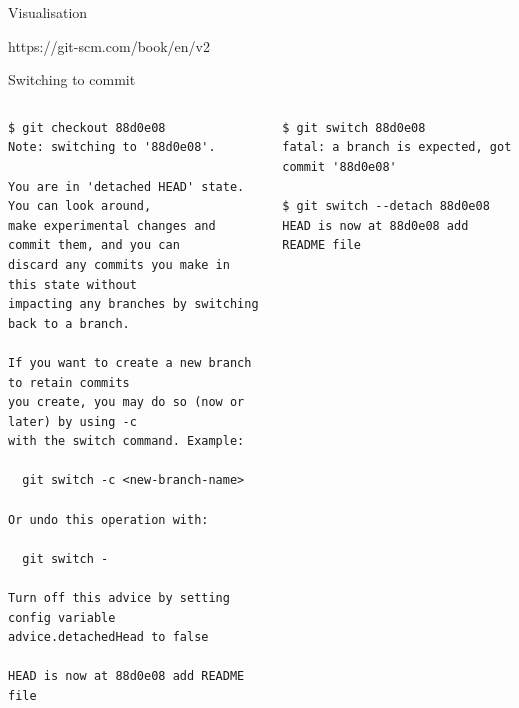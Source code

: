\documentclass[presentation,aspectratio=169,smaller]{beamer}
\begin{document}
\begin{frame}[label={sec:org1e2aa27}]{Visualisation}
\begin{onlyenv}
\scriptsize{https://git-scm.com/book/en/v2}
\end{onlyenv}
\end{frame}

\begin{frame}[label={sec:org5a6f818},fragile]{Switching to commit}
 \begin{columns}
\begin{column}[t]{0.46\columnwidth}
\begin{verbatim}
$ git checkout 88d0e08
Note: switching to '88d0e08'.

You are in 'detached HEAD' state. You can look around,
make experimental changes and commit them, and you can
discard any commits you make in this state without
impacting any branches by switching back to a branch.

If you want to create a new branch to retain commits
you create, you may do so (now or later) by using -c
with the switch command. Example:

  git switch -c <new-branch-name>

Or undo this operation with:

  git switch -

Turn off this advice by setting config variable
advice.detachedHead to false

HEAD is now at 88d0e08 add README file
\end{verbatim}
\end{column}

\begin{column}[t]{0.46\columnwidth}
\begin{verbatim}
$ git switch 88d0e08
fatal: a branch is expected, got commit '88d0e08'

$ git switch --detach 88d0e08
HEAD is now at 88d0e08 add README file
\end{verbatim}
\end{column}
\end{columns}
\end{frame}
\end{document}
